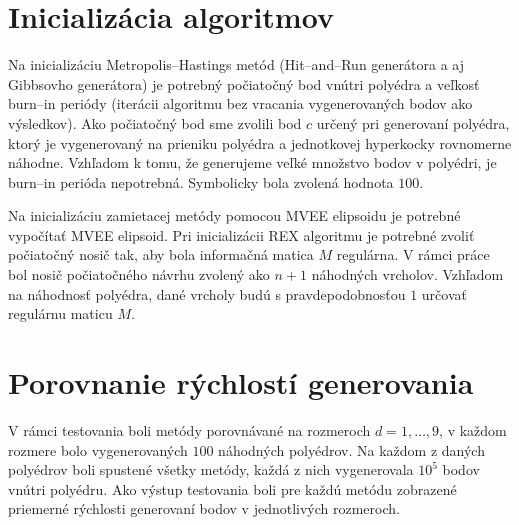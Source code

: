 \section{Inicializácia algoritmov}

Na inicializáciu Metropolis--Hastings metód (Hit--and--Run generátora a aj Gibbsovho generátora) je potrebný počiatočný bod vnútri polyédra a veľkosť burn--in periódy (iterácii algoritmu bez vracania vygenerovaných bodov ako výsledkov). Ako počiatočný bod sme zvolili bod $c$ určený pri generovaní polyédra, ktorý je vygenerovaný na prieniku polyédra a jednotkovej hyperkocky rovnomerne náhodne. Vzhľadom k tomu, že generujeme veľké množstvo bodov v polyédri, je burn--in perióda nepotrebná. Symbolicky bola zvolená hodnota $100$.

Na inicializáciu zamietacej metódy pomocou MVEE elipsoidu je potrebné vypočítať MVEE elipsoid. Pri inicializácii REX algoritmu je potrebné zvoliť počiatočný nosič tak, aby bola informačná matica $M$ regulárna. V rámci práce bol nosič počiatočného návrhu zvolený ako $n+1$ náhodných vrcholov. Vzhľadom na náhodnosť polyédra, dané vrcholy budú s pravdepodobnosťou $1$ určovať regulárnu maticu $M$.

\section{Porovnanie rýchlostí generovania}

V rámci testovania boli metódy porovnávané na rozmeroch $d=1, \dots, 9$, v každom rozmere bolo vygenerovaných $100$ náhodných polyédrov. Na každom z daných polyédrov boli spustené všetky metódy, každá z nich vygenerovala $10^5$ bodov vnútri polyédru. Ako výstup testovania boli pre každú metódu zobrazené priemerné rýchlosti generovaní bodov v jednotlivých rozmeroch.

